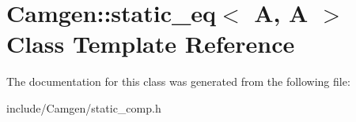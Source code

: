 \hypertarget{a00507}{\section{Camgen\-:\-:static\-\_\-eq$<$ A, A $>$ Class Template Reference}
\label{a00507}
}


The documentation for this class was generated from the following file\-:\begin{DoxyCompactItemize}
\item 
include/\-Camgen/static\-\_\-comp.\-h\end{DoxyCompactItemize}
